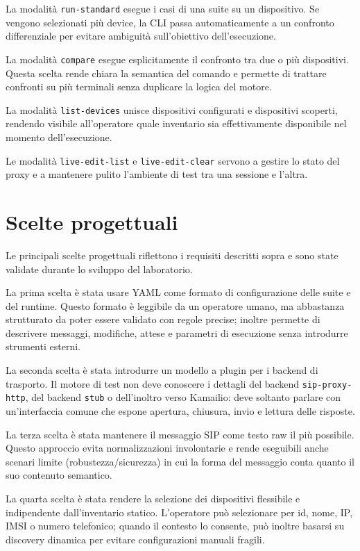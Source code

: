 La modalit\`a \texttt{run-\allowbreak standard} esegue i casi di una suite su un dispositivo. Se vengono selezionati pi\`u device, la CLI passa automaticamente a un confronto differenziale per evitare ambiguit\`a sull'obiettivo dell'esecuzione.

La modalit\`a \texttt{compare} esegue esplicitamente il confronto tra due o pi\`u dispositivi. Questa scelta rende chiara la semantica del comando e permette di trattare confronti su pi\`u terminali senza duplicare la logica del motore.

La modalit\`a \texttt{list-\allowbreak devices} unisce dispositivi configurati e dispositivi scoperti, rendendo visibile all'operatore quale inventario sia effettivamente disponibile nel momento dell'esecuzione.

Le modalit\`a \texttt{live-\allowbreak edit-\allowbreak list} e \texttt{live-\allowbreak edit-\allowbreak clear} servono a gestire lo stato del proxy e a mantenere pulito l'ambiente di test tra una sessione e l'altra.

\section{Scelte progettuali}
Le principali scelte progettuali riflettono i requisiti descritti sopra e sono state validate durante lo sviluppo del laboratorio.

La prima scelta \`e stata usare YAML come formato di configurazione delle suite e del runtime. Questo formato \`e leggibile da un operatore umano, ma abbastanza strutturato da poter essere validato con regole precise; inoltre permette di descrivere messaggi, modifiche, attese e parametri di esecuzione senza introdurre strumenti esterni.

La seconda scelta \`e stata introdurre un modello a plugin per i backend di trasporto. Il motore di test non deve conoscere i dettagli del backend \texttt{sip-proxy-http}, del backend \texttt{stub} o dell'inoltro verso Kamailio: deve soltanto parlare con un'interfaccia comune che espone apertura, chiusura, invio e lettura delle risposte.

La terza scelta \`e stata mantenere il messaggio SIP come testo raw il pi\`u possibile. Questo approccio evita normalizzazioni involontarie e rende eseguibili anche scenari limite (robustezza/sicurezza) in cui la forma del messaggio conta quanto il suo contenuto semantico.

La quarta scelta \`e stata rendere la selezione dei dispositivi flessibile e indipendente dall'inventario statico. L'operatore pu\`o selezionare per id, nome, IP, IMSI o numero telefonico; quando il contesto lo consente, pu\`o inoltre basarsi su discovery dinamica per evitare configurazioni manuali fragili.

